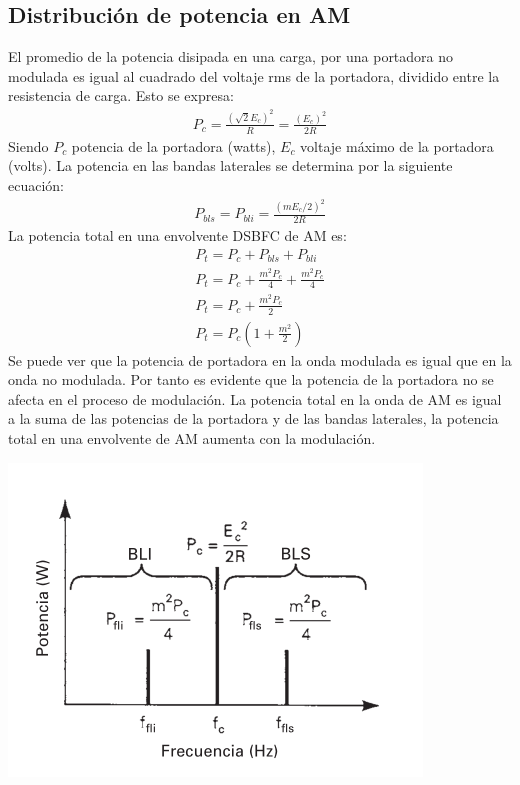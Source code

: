 \documentclass[10pt,a4paper]{article}
\begin{document}
\subsection{Distribución de potencia en AM}
El promedio de la potencia disipada en una carga, por una portadora no modulada es igual al cuadrado del voltaje rms de la portadora, dividido entre la resistencia de carga. Esto se expresa:
\begin{align}
	P_c=\frac{(\sqrt{2}E_c)^2}{R}=\frac{(E_c)^2}{2R}
\end{align}
Siendo $P_c$ potencia de la portadora (watts), $E_c$ voltaje máximo de la portadora (volts).
La potencia en las bandas laterales se determina por la siguiente ecuación:
\begin{align}
	P_{bls}=P_{bli}=\frac{(mE_c/2)^2}{2R}
\end{align}
La potencia total en una envolvente DSBFC de AM es:
\begin{align}
	P_t=P_c+P_{bls}+P_{bli}                   \\
	P_t=P_c+\frac{m^2P_c}{4}+\frac{m^2P_c}{4} \\
	P_t=P_c+\frac{m^2P_c}{2}                  \\
	P_t=P_c\left(1+\frac{m^2}{2}\right)
\end{align}
Se puede ver que la potencia de portadora en la onda modulada es igual que en la onda no modulada. Por tanto es evidente que la potencia de la portadora no se afecta en el proceso de modulación. La potencia total en la onda de AM es igual a la suma de las potencias de la portadora y de las bandas laterales, la potencia total en una envolvente de AM aumenta con la modulación.

\begin{center}
	\includegraphics[scale=0.5]{screenshot003}
\end{center}
\end{document}
